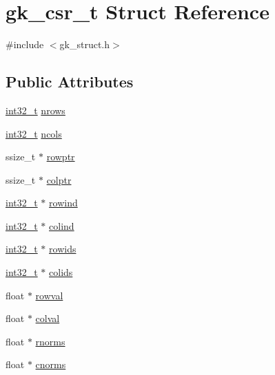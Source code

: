 \hypertarget{structgk__csr__t}{}\section{gk\+\_\+csr\+\_\+t Struct Reference}
\label{structgk__csr__t}


{\ttfamily \#include $<$gk\+\_\+struct.\+h$>$}

\subsection*{Public Attributes}
\begin{DoxyCompactItemize}
\item 
\hyperlink{ms__stdint_8h_a37994e3b11c72957c6f454c6ec96d43d}{int32\+\_\+t} \hyperlink{structgk__csr__t_a41a9fdec2897ac85c0adb3bf682f2e05}{nrows}
\item 
\hyperlink{ms__stdint_8h_a37994e3b11c72957c6f454c6ec96d43d}{int32\+\_\+t} \hyperlink{structgk__csr__t_ae5538bf8d2abd4db9d7e7539fb55f7bd}{ncols}
\item 
ssize\+\_\+t $\ast$ \hyperlink{structgk__csr__t_ab82e0c356c0bd80e9cb55c2c6c087fff}{rowptr}
\item 
ssize\+\_\+t $\ast$ \hyperlink{structgk__csr__t_af0cacdb3930ebf5c9dd9f38fb7b60205}{colptr}
\item 
\hyperlink{ms__stdint_8h_a37994e3b11c72957c6f454c6ec96d43d}{int32\+\_\+t} $\ast$ \hyperlink{structgk__csr__t_a5dc63718b2bc7a37633af72bb5bb1920}{rowind}
\item 
\hyperlink{ms__stdint_8h_a37994e3b11c72957c6f454c6ec96d43d}{int32\+\_\+t} $\ast$ \hyperlink{structgk__csr__t_a7ec1d81e61053234c9d42fb6913d0e9f}{colind}
\item 
\hyperlink{ms__stdint_8h_a37994e3b11c72957c6f454c6ec96d43d}{int32\+\_\+t} $\ast$ \hyperlink{structgk__csr__t_a67793a3dd041410532a1c04a1cb0de7e}{rowids}
\item 
\hyperlink{ms__stdint_8h_a37994e3b11c72957c6f454c6ec96d43d}{int32\+\_\+t} $\ast$ \hyperlink{structgk__csr__t_ad03b1a0a39247c0de8d2746b8f9b9c51}{colids}
\item 
float $\ast$ \hyperlink{structgk__csr__t_a7a80bc12a274ee31af6a5797ddbf13f3}{rowval}
\item 
float $\ast$ \hyperlink{structgk__csr__t_a62f3433aa0b366a74e6c4b3847bb5cca}{colval}
\item 
float $\ast$ \hyperlink{structgk__csr__t_a0b0e31ffd5f815a8521ebda5cfb889ad}{rnorms}
\item 
float $\ast$ \hyperlink{structgk__csr__t_a7fce0eac524c7f5c889b6c44a3ee41fb}{cnorms}

\end{DoxyCompactItemize}
